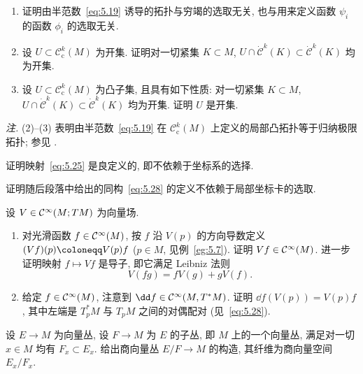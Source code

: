 \begin{exer}[归纳极限拓扑]\label{ex:5.3}
\begin{enumerate}
    \item 证明由半范数~\eqref{eq:5.19} 诱导的拓扑与穷竭的选取无关, 也与用来定义函数 $\psi_i$ 的函数 $\phi_i$ 的选取无关.
    \item 设 $U \subset \mathcal{C}_{\mathrm{c}}^k(M)$ 为开集. 证明对一切紧集 $K \subset M$, $U \cap \dot{\mathcal{C}}^k(K) \subset \dot{\mathcal{C}}^k(K)$ 均为开集.
    \item 设 $U \subset \mathcal{C}_{\mathrm{c}}^k(M)$ 为凸子集, 且具有如下性质: 对一切紧集 $K \subset M$, $U \cap \dot{\mathcal{C}}^k(K) \subset \dot{\mathcal{C}}^k(K)$ 均为开集. 证明 $U$ 是开集.
\end{enumerate}
\emph{注.} (2)–(3) 表明由半范数~\eqref{eq:5.19} 在 $\mathcal{C}_{\mathrm{c}}^k(M)$ 上定义的局部凸拓扑等于归纳极限拓扑; 参见 \cite[定理 V.15]{RS72}.
\end{exer}

\begin{exer}[切向量作为方向导数]\label{ex:5.4}
证明映射~\eqref{eq:5.25} 是良定义的, 即不依赖于坐标系的选择.
\end{exer}

\begin{exer}[余切丛作为切丛的对偶]\label{ex:5.5}
证明随后段落中给出的同构~\eqref{eq:5.28} 的定义不依赖于局部坐标卡的选取.
\end{exer}

\begin{exer}[导数与外微分]\label{ex:5.6}
设 $V \in \mathcal{C}^\infty(M; TM)$ 为向量场.
\begin{enumerate}
    \item 对光滑函数 $f \in \mathcal{C}^\infty(M)$, 按 $f$ 沿 $V(p)$ 的方向导数定义 $(V f)(p) \defeq V(p) f$ ($p \in M$, 见例~\ref{eg:5.7}). 证明 $V f \in \mathcal{C}^\infty(M)$. 进一步证明映射 $f \mapsto V f$ 是导子, 即它满足 Leibniz 法则
    \begin{equation}\label{eq:5.210}
        V(f g) = f V(g) + g V(f).
    \end{equation}
    \item 给定 $f \in \mathcal{C}^\infty(M)$, 注意到 $\dd f \in \Smooth(M, T^* M)$. 证明 $\dd f(V(p)) = V(p) f$, 其中左端是 $T_p^* M$ 与 $T_p M$ 之间的对偶配对 (见~\eqref{eq:5.28}).
\end{enumerate}
\end{exer}

\begin{exer}[商向量丛]\label{ex:5.7}
设 $E \to M$ 为向量丛, 设 $F \to M$ 为 $E$ 的子丛, 即 $M$ 上的一个向量丛, 满足对一切 $x \in M$ 均有 $F_x \subset E_x$. 给出商向量丛 $E / F \to M$ 的构造, 其纤维为商向量空间 $E_x / F_x$.
\end{exer}

